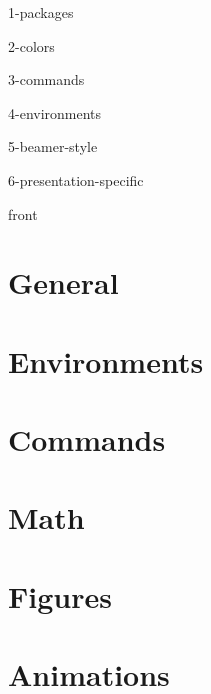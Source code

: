 \def\shareable{0} %
\newcommand{\configpath}{.config/}
\newcommand{\specificpath}{.config/}

\usepackage{import}

{1-packages}

{2-colors}

{3-commands}

{4-environments}

{5-beamer-style}

{6-presentation-specific}

{front} %

\section{General}


\section{Environments}


\section{Commands}


\section{Math}


\section{Figures}


\section{Animations}


